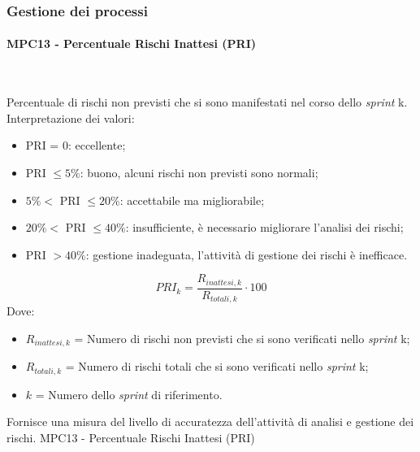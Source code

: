 \documentclass[10pt, letterpaper]{article}
\newcommand{\trisubsection}[1]{\paragraph{#1}\mbox{}\\}
\begin{document}
\subsubsection{Gestione dei processi}
\trisubsection{MPC13 - Percentuale Rischi Inattesi (PRI)}
{Percentuale di rischi non previsti che si sono manifestati nel corso dello \textit{sprint} k.
    Interpretazione dei valori:
    \begin{itemize}
        \item PRI = 0: eccellente;
        \item PRI $\leq 5\%$: buono, alcuni rischi non previsti sono normali;
        \item $5\% < $ PRI $ \leq 20\%$: accettabile ma migliorabile;
        \item $20\% < $ PRI $ \leq 40\%$: insufficiente, è necessario migliorare l'analisi dei rischi;
        \item PRI $> 40\%$: gestione inadeguata, l'attività di gestione dei rischi è inefficace.
    \end{itemize}}
{\[ PRI_k = \frac{R_{inattesi,k}}{R_{totali,k}} \cdot 100 \]
    Dove:
    \begin{itemize}
        \item $R_{inattesi,k}$ = Numero di rischi non previsti che si sono verificati nello \textit{sprint} k;
        \item $R_{totali,k}$ = Numero di rischi totali che si sono verificati nello \textit{sprint} k;
        \item $k$ = Numero dello \textit{sprint} di riferimento.
    \end{itemize}
}
{Fornisce una misura del livello di accuratezza dell'attività di analisi
    e gestione dei rischi.}
{MPC13 - Percentuale Rischi Inattesi (PRI)}
\end{document}
